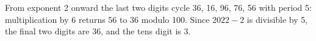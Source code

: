 From exponent 2 onward the last two digits cycle 36, 16, 96, 76, 56 with period 5: multiplication by 6 returns 56 to 36 modulo 100. Since $2022-2$ is divisible by 5, the final two digits are 36, and the tens digit is $\boxed3$.
